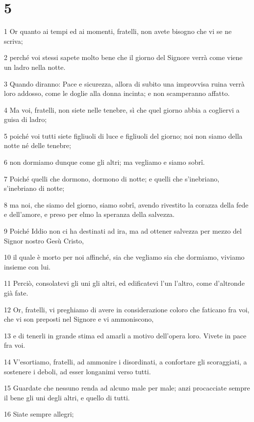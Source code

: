 \chapter{5}

\par 1 Or quanto ai tempi ed ai momenti, fratelli, non avete bisogno che vi se ne scriva;
\par 2 perché voi stessi sapete molto bene che il giorno del Signore verrà come viene un ladro nella notte.
\par 3 Quando diranno: Pace e sicurezza, allora di subito una improvvisa ruina verrà loro addosso, come le doglie alla donna incinta; e non scamperanno affatto.
\par 4 Ma voi, fratelli, non siete nelle tenebre, sì che quel giorno abbia a cogliervi a guisa di ladro;
\par 5 poiché voi tutti siete figliuoli di luce e figliuoli del giorno; noi non siamo della notte né delle tenebre;
\par 6 non dormiamo dunque come gli altri; ma vegliamo e siamo sobrî.
\par 7 Poiché quelli che dormono, dormono di notte; e quelli che s'inebriano, s'inebriano di notte;
\par 8 ma noi, che siamo del giorno, siamo sobrî, avendo rivestito la corazza della fede e dell'amore, e preso per elmo la speranza della salvezza.
\par 9 Poiché Iddio non ci ha destinati ad ira, ma ad ottener salvezza per mezzo del Signor nostro Gesù Cristo,
\par 10 il quale è morto per noi affinché, sia che vegliamo sia che dormiamo, viviamo insieme con lui.
\par 11 Perciò, consolatevi gli uni gli altri, ed edificatevi l'un l'altro, come d'altronde già fate.
\par 12 Or, fratelli, vi preghiamo di avere in considerazione coloro che faticano fra voi, che vi son preposti nel Signore e vi ammoniscono,
\par 13 e di tenerli in grande stima ed amarli a motivo dell'opera loro. Vivete in pace fra voi.
\par 14 V'esortiamo, fratelli, ad ammonire i disordinati, a confortare gli scoraggiati, a sostenere i deboli, ad esser longanimi verso tutti.
\par 15 Guardate che nessuno renda ad alcuno male per male; anzi procacciate sempre il bene gli uni degli altri, e quello di tutti.
\par 16 Siate sempre allegri;
